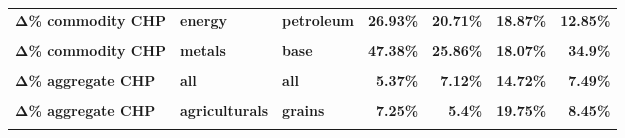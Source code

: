 \documentclass[
  authoryear,
  preprint,
  3p]{elsarticle}
\begin{document}
\begin{longtable}[t]{>{}l>{}l>{}l>{}r>{}r>{}r>{}r}
\textbf{Δ\% commodity CHP} & \textbf{energy} & \textbf{petroleum} & \textcolor[HTML]{4285f4}{\textbf{26.93\%}} & \textcolor[HTML]{4285f4}{\textbf{20.71\%}} & \textcolor[HTML]{4285f4}{\textbf{18.87\%}} & \textcolor[HTML]{4285f4}{\textbf{12.85\%}}\\
\textbf{\cellcolor{gray!10}{Δ\% commodity CHP}} & \textbf{\cellcolor{gray!10}{metals}} & \textbf{\cellcolor{gray!10}{all}} & \textcolor[HTML]{4285f4}{\textbf{\cellcolor{gray!10}{28.12\%}}} & \textcolor[HTML]{4285f4}{\textbf{\cellcolor{gray!10}{19.1\%}}} & \textcolor[HTML]{4285f4}{\textbf{\cellcolor{gray!10}{23.27\%}}} & \textcolor[HTML]{4285f4}{\textbf{\cellcolor{gray!10}{37.32\%}}}\\
\textbf{Δ\% commodity CHP} & \textbf{metals} & \textbf{base} & \textcolor[HTML]{4285f4}{\textbf{47.38\%}} & \textcolor[HTML]{4285f4}{\textbf{25.86\%}} & \textcolor[HTML]{4285f4}{\textbf{18.07\%}} & \textcolor[HTML]{4285f4}{\textbf{34.9\%}}\\
\addlinespace
\textbf{\cellcolor{gray!10}{Δ\% commodity CHP}} & \textbf{\cellcolor{gray!10}{metals}} & \textbf{\cellcolor{gray!10}{precious}} & \textcolor[HTML]{4285f4}{\textbf{\cellcolor{gray!10}{23.3\%}}} & \textcolor[HTML]{4285f4}{\textbf{\cellcolor{gray!10}{17.41\%}}} & \textcolor[HTML]{4285f4}{\textbf{\cellcolor{gray!10}{24.57\%}}} & \textcolor[HTML]{4285f4}{\textbf{\cellcolor{gray!10}{37.93\%}}}\\
\textbf{Δ\% aggregate CHP} & \textbf{all} & \textbf{all} & \textcolor[HTML]{4285f4}{\textbf{5.37\%}} & \textcolor[HTML]{4285f4}{\textbf{7.12\%}} & \textcolor[HTML]{4285f4}{\textbf{14.72\%}} & \textcolor[HTML]{4285f4}{\textbf{7.49\%}}\\
\textbf{\cellcolor{gray!10}{Δ\% aggregate CHP}} & \textbf{\cellcolor{gray!10}{agriculturals}} & \textbf{\cellcolor{gray!10}{all}} & \textcolor[HTML]{4285f4}{\textbf{\cellcolor{gray!10}{4.91\%}}} & \textcolor[HTML]{4285f4}{\textbf{\cellcolor{gray!10}{4.5\%}}} & \textcolor[HTML]{4285f4}{\textbf{\cellcolor{gray!10}{12.14\%}}} & \textcolor[HTML]{4285f4}{\textbf{\cellcolor{gray!10}{6.23\%}}}\\
\textbf{Δ\% aggregate CHP} & \textbf{agriculturals} & \textbf{grains} & \textcolor[HTML]{4285f4}{\textbf{7.25\%}} & \textcolor[HTML]{4285f4}{\textbf{5.4\%}} & \textcolor[HTML]{4285f4}{\textbf{19.75\%}} & \textcolor[HTML]{4285f4}{\textbf{8.45\%}}\\
\textbf{\cellcolor{gray!10}{Δ\% aggregate CHP}} & \textbf{\cellcolor{gray!10}{agriculturals}} & \textbf{\cellcolor{gray!10}{livestock}} & \textcolor[HTML]{4285f4}{\textbf{\cellcolor{gray!10}{1.35\%}}} & \textcolor[HTML]{4285f4}{\textbf{\cellcolor{gray!10}{0.41\%}}} & \textcolor[HTML]{4285f4}{\textbf{\cellcolor{gray!10}{0.52\%}}} & \textcolor[HTML]{4285f4}{\textbf{\cellcolor{gray!10}{0.26\%}}}\\

\end{longtable}
\end{document}

